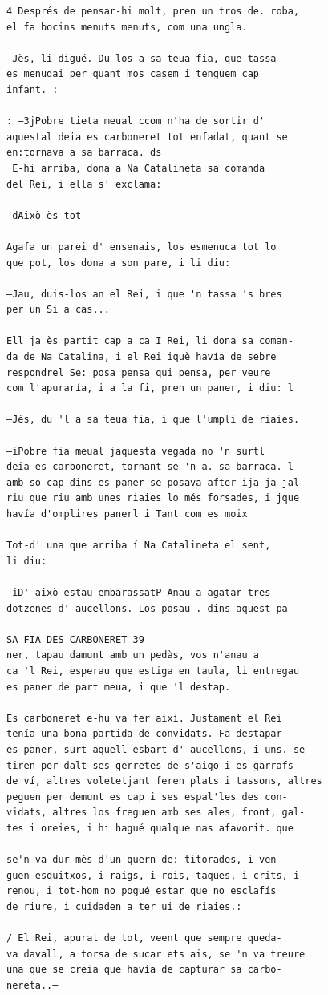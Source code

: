 \documentclass[
  letterpaper,
  DIV=11,
  numbers=noendperiod]{scrreprt}
\begin{document}
\begin{verbatim}
4 Després de pensar-hi molt, pren un tros de. roba,
el fa bocins menuts menuts, com una ungla.

—Jès, li digué. Du-los a sa teua fia, que tassa
es menudai per quant mos casem i tenguem cap
infant. :

: —3jPobre tieta meual ccom n'ha de sortir d'
aquestal deia es carboneret tot enfadat, quant se
en:tornava a sa barraca. ds
 E-hi arriba, dona a Na Catalineta sa comanda
del Rei, i ella s' exclama:

—dAixò ès tot

Agafa un parei d' ensenais, los esmenuca tot lo
que pot, los dona a son pare, i li diu:

—Jau, duis-los an el Rei, i que 'n tassa 's bres
per un Si a cas...

Ell ja ès partit cap a ca I Rei, li dona sa coman-
da de Na Catalina, i el Rei iquè havía de sebre
respondrel Se: posa pensa qui pensa, per veure
com l'apuraría, i a la fi, pren un paner, i diu: l

—Jès, du 'l a sa teua fia, i que l'umpli de riaies.

—iPobre fia meual jaquesta vegada no 'n surtl
deia es carboneret, tornant-se 'n a. sa barraca. l
amb so cap dins es paner se posava after ija ja jal
riu que riu amb unes riaies lo més forsades, i jque
havía d'omplires panerl i Tant com es moix

Tot-d' una que arriba í Na Catalineta el sent,
li diu:

—iD' això estau embarassatP Anau a agatar tres
dotzenes d' aucellons. Los posau . dins aquest pa-

SA FIA DES CARBONERET 39
ner, tapau damunt amb un pedàs, vos n'anau a
ca 'l Rei, esperau que estiga en taula, li entregau
es paner de part meua, i que 'l destap.

Es carboneret e-hu va fer així. Justament el Rei
tenía una bona partida de convidats. Fa destapar
es paner, surt aquell esbart d' aucellons, i uns. se
tiren per dalt ses gerretes de s'aigo i es garrafs
de ví, altres voletetjant feren plats i tassons, altres
peguen per demunt es cap i ses espal'les des con-
vidats, altres los freguen amb ses ales, front, gal-
tes i oreies, i hi hagué qualque nas afavorit. que

se'n va dur més d'un quern de: titorades, i ven-
guen esquitxos, i raigs, i rois, taques, i crits, i
renou, i tot-hom no pogué estar que no esclafís
de riure, i cuidaden a ter ui de riaies.:

/ El Rei, apurat de tot, veent que sempre queda-
va davall, a torsa de sucar ets ais, se 'n va treure
una que se creia que havía de capturar sa carbo-
nereta..—


\end{verbatim}
\end{document}
